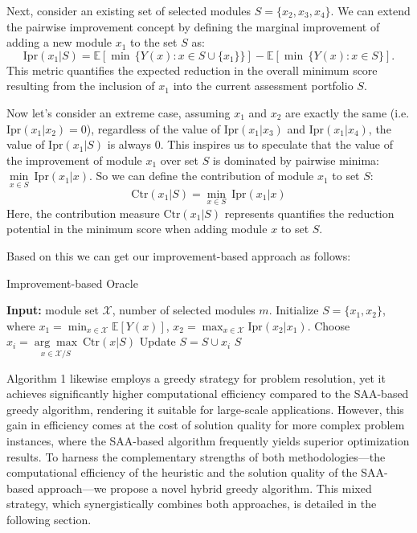 \documentclass[opre,sglanonrev]{informs4}
\begin{document}
Next, consider an existing set of selected modules $S = \{x_2, x_3, x_4\}$. We can extend the pairwise improvement concept by defining the marginal improvement of adding a new module $x_1$ to the set $S$ as:
$$
\text{Ipr}(x_1 | S) = \mathbb{E}\left[\min\,\{Y(x) : x \in S \cup \{x_1\}\}\right] - \mathbb{E}\left[\min\,\{Y(x) : x \in S\}\right].
$$
This metric quantifies the expected reduction in the overall minimum score resulting from the inclusion of $x_1$ into the current assessment portfolio $S$.

Now let's consider an extreme case, assuming $x_1$ and $x_2$ are exactly the same (i.e. $\text{Ipr}(x_1|x_2)=0$), regardless of the value of $\text{Ipr}(x_1|x_3)$ and $\text{Ipr}(x_1|x_4)$, the value of $\text{Ipr}(x_1|S)$ is always $0$. This inspires us to speculate that the value of the improvement of module $x_1$ over set $S$ is dominated by pairwise minima: $\underset{x\in S}{{\min}}~\text{Ipr}(x_1|x)$. So we can define the contribution of module $x_1$ to set $S$: 
$$
\text{Ctr}(x_1|S) = \underset{x\in S}{{\min}}~\text{Ipr}(x_1|x)
$$
Here, the contribution measure $\text{Ctr}(x_1|S)$ represents quantifies the reduction potential in the minimum score when adding module $x$ to set $S$.

Based on this we can get our improvement-based approach as follows:

\begin{algorithm}
\caption{Improvement-based Oracle} %
\label{alg:improvement} %
\begin{algorithmic}[1] %
\State \textbf{Input:} module set $\mathcal{X}$, number of selected modules $m$.
\State Initialize $S = \{x_1,x_2\}$, where $x_1 = \min_{x\in \mathcal{X}} \mathbb{E}[Y(x)]$, $x_2 = \max_{x\in \mathcal{X}} \text{Ipr}(x_2|x_1)$.
    \State Choose $x_i = \underset{x\in \mathcal{X}/S}{{\arg\max}}~\text{Ctr}(x|S)$
    \State Update $S = S \cup x_i$
\EndFor
\State \Return $S$
\end{algorithmic}
\end{algorithm}
Algorithm 1 likewise employs a greedy strategy for problem resolution, yet it achieves significantly higher computational efficiency compared to the SAA-based greedy algorithm, rendering it suitable for large-scale applications. However, this gain in efficiency comes at the cost of solution quality for more complex problem instances, where the SAA-based algorithm frequently yields superior optimization results. To harness the complementary strengths of both methodologies---the computational efficiency of the heuristic and the solution quality of the SAA-based approach---we propose a novel hybrid greedy algorithm. This mixed strategy, which synergistically combines both approaches, is detailed in the following section.
\end{document}
